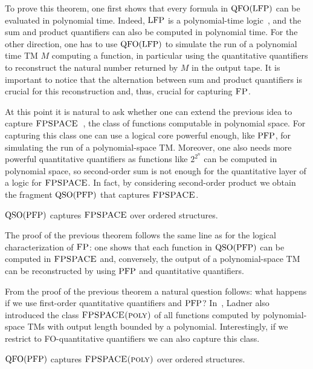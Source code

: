 To prove this theorem, 
one first shows that every formula in ${\rm QFO}({\rm LFP})$ can be evaluated in polynomial time. 
Indeed, ${\rm LFP}$ is a polynomial-time logic~\cite{I86,vardi1982complexity}, and the sum and product quantifiers can also be computed in polynomial time. 
For the other direction, one has to use ${\rm QFO}({\rm LFP})$ to simulate the run of a polynomial time TM $M$ computing a function, in particular using the quantitative quantifiers to reconstruct the natural number returned by $M$ in the output tape. 
It is important to notice that the alternation between sum and product quantifiers is crucial for this reconstruction and, thus, crucial for capturing $\text{\sc FP}$.

At this point it is natural to ask whether one can extend the previous idea to capture $\text{\sc FPSPACE}$~\cite{Ladner89}, the class of functions computable in polynomial space. 
For capturing this class one can use a logical core powerful enough, like ${\rm PFP}$, for simulating the run of a polynomial-space TM.
Moreover, 
one also needs more powerful quantitative quantifiers as functions like $2^{2^n}$ can be computed in polynomial space,
so second-order sum is not enough for the quantitative layer of a logic for $\text{\sc FPSPACE}$.
In fact, by considering second-order product we obtain the fragment ${\rm QSO}({\rm PFP})$ that 
captures $\text{\sc FPSPACE}$. 
\begin{theorem} \label{theo:capture-fpspace}
	${\rm QSO}({\rm PFP})$ captures $\text{\sc FPSPACE}$ over ordered structures.
\end{theorem}
The proof of the previous theorem follows the same line as for the logical characterization of $\text{\sc FP}$: one shows that each function in ${\rm QSO}({\rm PFP})$ can be computed in $\text{\sc FPSPACE}$ and, conversely, the output of a polynomial-space TM can be reconstructed by using ${\rm PFP}$ and quantitative quantifiers.

From the proof of the previous theorem a natural question follows: what happens if we use first-order quantitative quantifiers and ${\rm PFP}$?
In~\cite{Ladner89}, Ladner also introduced the class $\text{\sc FPSPACE(poly)}$ of all functions computed by polynomial-space TMs 
with output length bounded by a polynomial.
Interestingly, if we restrict to FO-quantitative quantifiers we can also capture this class.
\begin{corollary} \label{cor:capture-fpspace-poly}
	${\rm QFO}({\rm PFP})$ captures $\text{\sc FPSPACE(poly)}$ over ordered structures.
\end{corollary}

